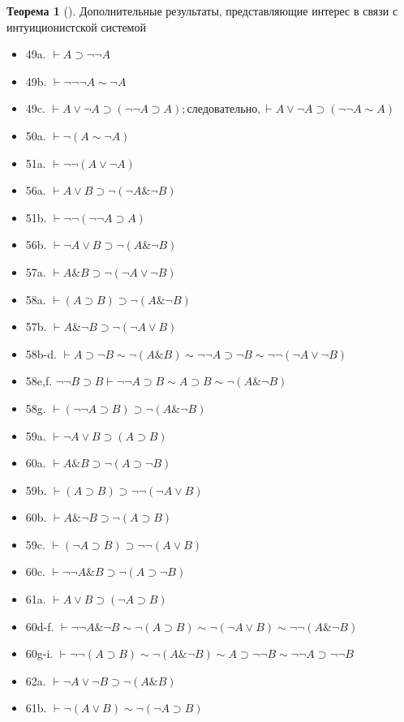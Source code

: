 \documentclass[a4paper, 12pt]{article}  %
\DeclareMathOperator{\conj}{\mathbb{\&}}
\theoremstyle{definition}
\newtheorem{theorem}{Теорема}
\begin{document}
\begin{theorem}[]
		Дополнительные результаты, представляющие интерес в связи с интуиционистской системой
		\begin{itemize}[label={}]
			\setlength\itemsep{0pt}	
			\item 49a. $\vdash A \supset \neg \neg A$		
			\item 49b. $\vdash \neg \neg \neg A \sim \neg A$		
			\item 49c. $\vdash A \vee \neg A \supset (\neg \neg A \supset A); следовательно, \vdash A \vee \neg A \supset (\neg \neg A \sim A)$		
			\item 50a. $\vdash \neg (A \sim \neg A)$		
			\item 51a. $\vdash \neg \neg (A \vee \neg A)$		
			\item 56a. $\vdash A \vee B \supset \neg (\neg A \conj \neg B)$		
			\item 51b. $\vdash \neg \neg (\neg \neg A \supset A)$		
			\item 56b. $\vdash \neg A \vee B \supset \neg (A \conj \neg B)$		
			\item 57a. $\vdash A \conj B \supset \neg (\neg A \vee \neg B)$	
			\item 58a. $\vdash (A \supset B) \supset \neg (A \conj \neg B)$			
			\item 57b. $\vdash A \conj \neg B \supset \neg (\neg A \vee B)$			
			\item 58b-d. $\vdash A \supset \neg B \sim \neg (A \conj B) \sim \neg \neg A \supset \neg B \sim \neg \neg (\neg A \vee \neg B)$			
			\item 58e,f. $\neg \neg B \supset B \vdash \neg \neg A \supset B \sim A \supset B \sim \neg (A \conj \neg B)$			
			\item 58g. $\vdash (\neg \neg A \supset B) \supset \neg (A \conj \neg B)$			
			\item 59a. $\vdash \neg A \vee B \supset (A \supset B)$			
			\item 60a. $\vdash A \conj B \supset \neg (A \supset \neg B)$			
			\item 59b. $\vdash (A \supset B) \supset \neg \neg (\neg A \vee B)$			
			\item 60b. $\vdash A \conj \neg B \supset \neg (A \supset B)$			
			\item 59c. $\vdash (\neg A \supset B) \supset \neg \neg (A \vee B)$			
			\item 60c. $\vdash \neg \neg A \conj B \supset \neg (A \supset \neg B)$			
			\item 61a. $\vdash A \vee B \supset (\neg A \supset B)$			
			\item 60d-f. $\vdash \neg \neg A \conj \neg B \sim \neg (A \supset B) \sim \neg (\neg A \vee B) \sim \neg \neg (A \conj \neg B)$
			\item 60g-i. $\vdash \neg \neg (A \supset B) \sim \neg (A \conj \neg B) \sim A \supset \neg \neg B \sim \neg \neg A \supset \neg \neg B$
			\item 62a. $\vdash \neg A \vee \neg B \supset \neg (A \conj B)$
			\item 61b. $\vdash \neg (A \vee B) \sim \neg (\neg A \supset B)$
		\end{itemize}
	\end{theorem}
\end{document}
